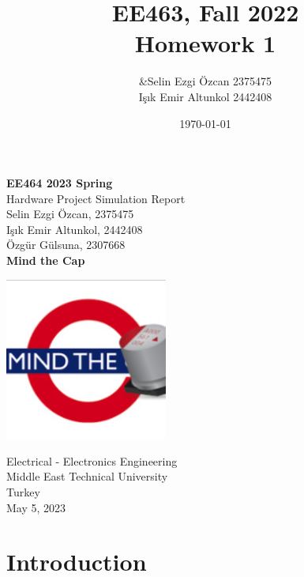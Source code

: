 \documentclass[12pt]{article}
\title{\textbf{EE463, Fall 2022} \\ Homework 1 }
\author{&Selin Ezgi Özcan 2375475 \\ Işık Emir Altunkol 2442408}
\date{\today}
\begin{document}
\begin{titlepage}
   \begin{center}
       \vspace*{1cm}
        
       \Huge
       \textbf{EE464 2023 Spring} \\
       \Large
       \vspace{0.5cm}
        Hardware Project Simulation Report\\
       \Large
       \vspace{0.5cm}  
        \large
       Selin Ezgi Özcan, 2375475 \\
       \vspace{0.2cm}
       Işık Emir Altunkol, 2442408 \\
       \vspace{0.2cm}
       Özgür Gülsuna, 2307668     \\
       \vspace{1.1cm}
        \textbf{Mind the Cap}
       \normalsize
       \vspace{2cm}
        
     
       \includegraphics[width=0.4\textwidth]{img/mindthecap.jpg}
            
       Electrical - Electronics Engineering\\
       Middle East Technical University\\
       Turkey\\
       \vspace{4cm}
       May 5, 2023
            
   \end{center}
\end{titlepage}

\tableofcontents



\section{Introduction}
\end{document}
